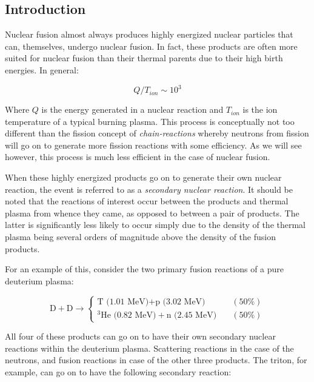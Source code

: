 \subsection{Introduction}
	
	Nuclear fusion almost always produces highly energized nuclear particles that can, themselves, undergo nuclear fusion. In fact, these products are often more suited for nuclear fusion than their thermal parents due to their high birth energies. In general:
	
	\begin{equation}
		Q / T_{ion} \sim 10^3
	\end{equation}

	Where $Q$ is the energy generated in a nuclear reaction and $T_{ion}$ is the ion temperature of a typical burning plasma. This process is conceptually not too different than the fission concept of \emph{chain-reactions} whereby neutrons from fission will go on to generate more fission reactions with some efficiency. As we will see however, this process is much less efficient in the case of nuclear fusion.
	
	When these highly energized products go on to generate their own nuclear reaction, the event is referred to as a \emph{secondary nuclear reaction}. It should be noted that the reactions of interest occur between the products and thermal plasma from whence they came, as opposed to between a pair of products. The latter is significantly less likely to occur simply due to the density of the thermal plasma being several orders of magnitude above the density of the fusion products. 
	
	For an example of this, consider the two primary fusion reactions of a pure deuterium plasma:
	
	\begin{equation}
		\text{D} + \text{D} \rightarrow \begin{cases}
			\text{T (1.01 MeV)} + \text{p (3.02 MeV)} \quad & (50\%)\\
			^3\text{He (0.82 MeV)} + \text{n (2.45 MeV)} \quad & (50\%)
		\end{cases}
	\end{equation}
	
	All four of these products can go on to have their own secondary nuclear reactions within the deuterium plasma. Scattering reactions in the case of the neutrons, and fusion reactions in case of the other three products. The triton, for example, can go on to have the following secondary reaction:
	

